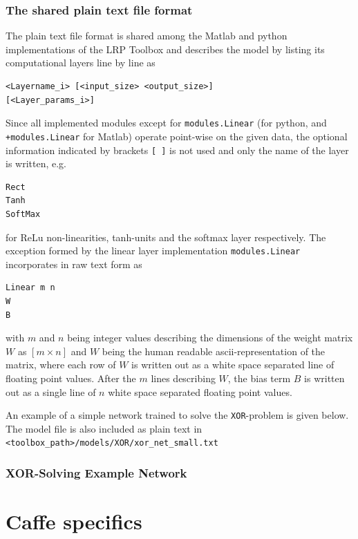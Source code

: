 \documentclass[a4wide]{article}
\begin{document}
\subsubsection*{The shared plain text file format}


		The plain text file format is shared among the Matlab and python implementations of the LRP Toolbox and describes 
        the model by listing its computational layers line by line as

        \begin{verbatim}
<Layername_i> [<input_size> <output_size>]
[<Layer_params_i>]
        \end{verbatim}
     
     	Since all implemented modules except for \texttt{modules.Linear} (for python, and \texttt{+modules.Linear} for Matlab) operate point-wise on the given data, the optional
        information indicated by brackets \texttt{[ ]} is not used and only the name of the layer is written, e.g.
     	
     	\begin{verbatim}  
Rect       
Tanh         
SoftMax
        \end{verbatim}
        for ReLu non-linearities, tanh-units and the softmax layer respectively. The exception formed by the linear layer implementation 				\texttt{modules.Linear} incorporates in raw text form as
        \begin{verbatim}
Linear m n
W
B
       \end{verbatim}       
        with $m$ and $n$ being integer values describing the dimensions of the weight matrix $W$ as $[m \times n]$ and
        $W$ being the human readable ascii-representation of the matrix, where each row of $W$ is written out as a
        white space separated line of floating point values.
        After the $m$ lines describing $W$, the bias term $B$ is written out as a single line of $n$ white space separated floating point values.
        
        An example of a simple network trained to solve the \texttt{XOR}-problem is given below. The model file is also included as plain text in \texttt{<toolbox\_path>/models/XOR/xor\_net\_small.txt}
        
\subsubsection*{XOR-Solving Example Network}


\section{Caffe specifics}
\label{sec:caffe_specifics}
\end{document}
